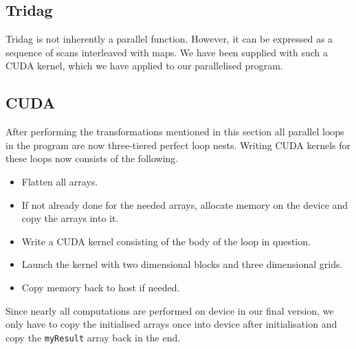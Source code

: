 \subsection{Tridag}
Tridag is not inherently a parallel function. However, it can be expressed as a sequence of scans interleaved with maps. We have
 been supplied with such a CUDA kernel, which we have applied to our parallelised program.

\subsection{CUDA}
After performing the transformations mentioned in this section all parallel loops in the program are now three-tiered perfect loop nests.
 Writing CUDA kernels for these loops now consists of the following.
 \begin{itemize}
 \item Flatten all arrays.
 \item If not already done for the needed arrays, allocate memory on the device and copy the arrays into it.
 \item Write a CUDA kernel consisting of the body of the loop in question.
 \item Launch the kernel with two dimensional blocks and three dimensional grids.
 \item Copy memory back to host if needed.
 \end{itemize}
Since nearly all computations are performed on device in our final version, we only have to copy the initialised arrays once into device
after initialisation and copy the \verb!myResult! array back in the end.